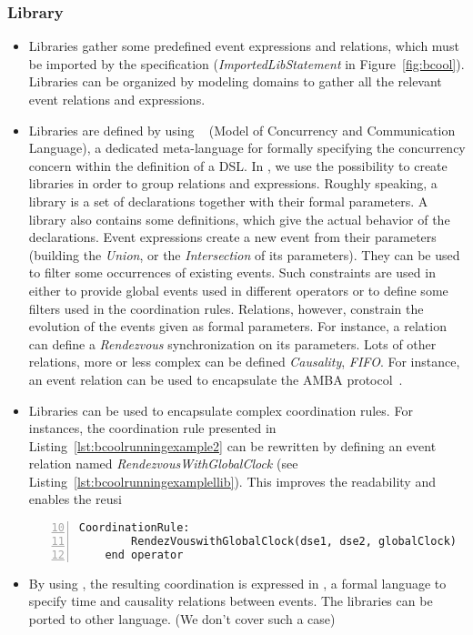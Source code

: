 \subsubsection{Library}
\label{subsec:bcoollib}

\begin{itemize}
	\item Libraries gather some predefined event expressions and relations, which must be imported by the specification (\emph{ImportedLibStatement} in Figure~\ref{fig:bcool}). Libraries can be organized by modeling domains to gather
	all the relevant event relations and expressions. 
	
	\item Libraries are defined by using \moccml~\cite{moccmlbib} (Model of Concurrency and Communication Language), a dedicated meta-language for formally specifying the concurrency concern	within the definition of a DSL. In \bcool, we use the possibility to create libraries in order to group relations and expressions. Roughly speaking, a \moccml library is a set of declarations together with their formal parameters. A library also contains some definitions, which give the actual behavior of the declarations. Event expressions create a new event from their parameters (\eg building the \textit{Union}, or the \textit{Intersection} of its parameters). They can be used to filter some occurrences of existing events. Such constraints are used in \bcool either to provide global events used in different operators or to define some filters used in the coordination rules. Relations, however, constrain the evolution of the events given as formal parameters. For instance, a relation can define a \textit{Rendezvous} synchronization on its parameters. Lots of other relations, more or less complex can be defined \eg \textit{Causality}, \textit{FIFO}. For instance, an event relation can be used to encapsulate the AMBA protocol~\cite{ambabus}. 


	\item Libraries can be used to encapsulate complex coordination rules. For instances, the coordination rule presented in Listing~\ref{lst:bcoolrunningexample2} can be rewritten by defining an event relation named \emph{RendezvousWithGlobalClock} (see Listing~\ref{lst:bcoolrunningexamplellib}). This improves the readability and enables the reusi    
	
	
	\begin{lstlisting}[language=bcool,
	caption={Synchronized product operator between the TFSM and Activity languages by using the library},
	label={lst:bcoolrunningexamplellib}, 
	basicstyle=\scriptsize\ttfamily, backgroundcolor=\color{LGrey}, numbers=left, firstnumber=10, xleftmargin=2pt]
	CoordinationRule: 
		RendezVouswithGlobalClock(dse1, dse2, globalClock)
	end operator
	\end{lstlisting}
	 
	 
	\item By using \moccml, the resulting coordination is expressed in \ccsl, a formal language to specify time and causality relations between events. The libraries can be ported to other language. (We don't cover such a case)
	
\end{itemize}

